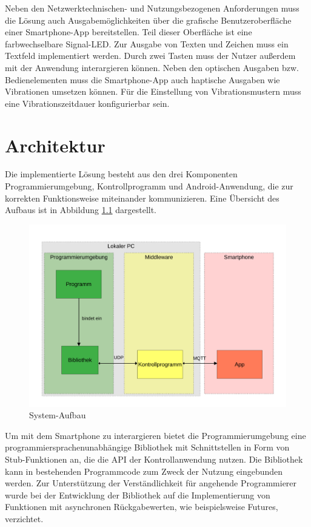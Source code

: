 \documentclass[11pt,a4paper]{report}
\begin{document}
Neben den Netzwerktechnischen- und Nutzungsbezogenen Anforderungen muss die Lösung auch Ausgabemöglichkeiten über die grafische Benutzeroberfläche einer Smartphone-App bereitstellen.
Teil dieser Oberfläche ist eine farbwechselbare Signal-LED.
Zur Ausgabe von Texten und Zeichen muss ein Textfeld implementiert werden.
Durch zwei Tasten muss der Nutzer außerdem mit der Anwendung interargieren können.
Neben den optischen Ausgaben bzw. Bedienelementen muss die Smartphone-App auch haptische Ausgaben wie Vibrationen umsetzen können.
Für die Einstellung von Vibrationsmustern muss eine Vibrationszeitdauer konfigurierbar sein.
\chapter{Architektur} \label{chap:architektur}
Die implementierte Lösung besteht aus den drei Komponenten Programmierumgebung, Kontrollprogramm und Android-Anwendung, die zur korrekten Funktionsweise miteinander kommunizieren.
Eine Übersicht des Aufbaus ist in Abbildung \ref{fig:design} dargestellt.
\begin{figure}[htbp]
\centering
\includegraphics[width=\textwidth]{images/framework.pdf}
\caption{System-Aufbau}
\label{fig:design}
\end{figure}
Um mit dem Smartphone zu interargieren bietet die Programmierumgebung eine programmiersprachenunabhängige Bibliothek mit Schnittstellen in Form von Stub-Funktionen an, die die API der Kontrollanwendung nutzen.
Die Bibliothek kann in bestehenden Programmcode zum Zweck der Nutzung eingebunden werden.
Zur Unterstützung der Verständlichkeit für angehende Programmierer wurde bei der Entwicklung der Bibliothek auf die Implementierung von Funktionen mit asynchronen Rückgabewerten, wie beispielsweise Futures, verzichtet.
\end{document}
